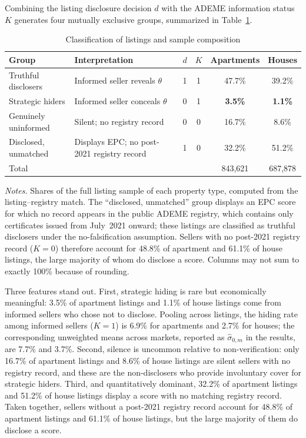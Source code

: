 Combining the listing disclosure decision $d$ with the ADEME information status $K$ generates four mutually exclusive groups, summarized in Table~\ref{tab:groups}.

\begin{table}[H]
\centering
\caption{Classification of listings and sample composition}
\label{tab:groups}
\small\renewcommand{\arraystretch}{1.3}
\begin{tabular}{llcccc}
\toprule\toprule
\textbf{Group} & \textbf{Interpretation} & $d$ & $K$ & \textbf{Apartments} & \textbf{Houses} \\
\midrule
Truthful disclosers  & Informed seller reveals $\theta$        & 1 & 1 & 47.7\% & 39.2\% \\
Strategic hiders     & Informed seller conceals $\theta$     & 0 & 1 & \textbf{3.5\%}  & \textbf{1.1\%}  \\
Genuinely uninformed & Silent; no registry record              & 0 & 0 & 16.7\% & 8.6\% \\
Disclosed, unmatched & Displays EPC; no post-2021 registry record & 1 & 0 & 32.2\% & 51.2\% \\
\midrule
Total                &                                         &   &   & 843,621 & 687,878 \\
\bottomrule\bottomrule
\end{tabular}
\vspace{0.5em}
\begin{minipage}{\linewidth}
\footnotesize\textit{Notes.} Shares of the full listing sample of each property type, computed from the
listing--registry match. The ``disclosed, unmatched'' group displays an EPC score for which no record
appears in the public ADEME registry, which contains only certificates issued from July~2021 onward;
these listings are classified as truthful disclosers under the no-falsification assumption. Sellers
with no post-2021 registry record ($K=0$) therefore account for 48.8\% of apartment and 61.1\% of
house listings, the large majority of whom do disclose a score. Columns may not sum to exactly 100\%
because of rounding.
\end{minipage}
\end{table}

\noindent Three features stand out. First, strategic hiding is rare but economically meaningful: 3.5\% of apartment listings and 1.1\% of house listings come from informed sellers who chose not to disclose. Pooling across listings, the hiding rate among informed sellers ($K=1$) is 6.9\% for apartments and 2.7\% for houses; the corresponding unweighted means across markets, reported as $\hat\sigma_{0,m}$ in the results, are 7.7\% and 3.7\%. Second, silence is uncommon relative to non-verification: only 16.7\% of apartment listings and 8.6\% of house listings are silent sellers with no registry record, and these are the non-disclosers who provide involuntary cover for strategic hiders. Third, and quantitatively dominant, 32.2\% of apartment listings and 51.2\% of house listings display a score with no matching registry record. Taken together, sellers without a post-2021 registry record account for 48.8\% of apartment listings and 61.1\% of house listings, but the large majority of them do disclose a score.

